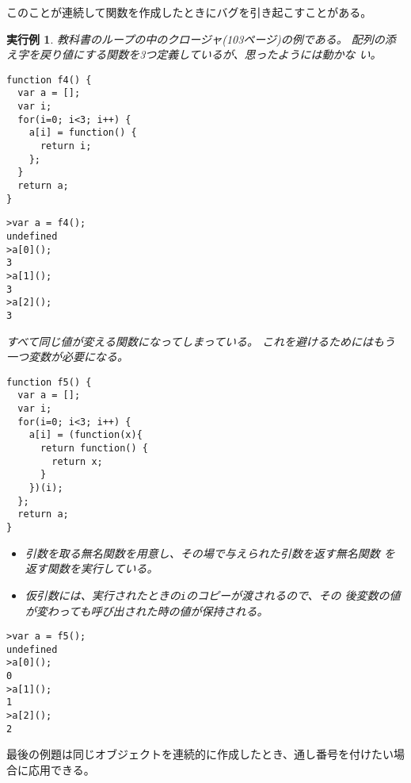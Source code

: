 \documentclass[a4j]{jarticle}
\newtheorem{Exec}{実行例}[section]
\begin{document}
このことが連続して関数を作成したときにバグを引き起こすことがある。
\begin{Exec}
 教科書のループの中のクロージャ(103ページ)の例である。
配列の添え字を戻り値にする関数を3つ定義しているが、思ったようには動かな
 い。
\begin{Verbatim}
function f4() {
  var a = [];
  var i;
  for(i=0; i<3; i++) {
    a[i] = function() {
      return i;
    };
  }
  return a;
}
\end{Verbatim}
\begin{Verbatim}
>var a = f4();
undefined
>a[0]();
3
>a[1]();
3
>a[2]();
3
\end{Verbatim}
すべて同じ値が変える関数になってしまっている。
これを避けるためにはもう一つ変数が必要になる。
\begin{Verbatim}
function f5() {
  var a = [];
  var i;
  for(i=0; i<3; i++) {
    a[i] = (function(x){
      return function() {
        return x;
      }
    })(i);
  };
  return a;
}
\end{Verbatim}
\begin{itemize}
 \item 引数を取る無名関数を用意し、その場で与えられた引数を返す無名関数
       を返す関数を実行している。
 \item 仮引数には、実行されたときの\verb+i+のコピーが渡されるので、その
       後変数の値が変わっても呼び出された時の値が保持される。
\end{itemize}
\begin{Verbatim}
>var a = f5();
undefined
>a[0]();
0
>a[1]();
1
>a[2]();
2
\end{Verbatim}
\end{Exec}
最後の例題は同じオブジェクトを連続的に作成したとき、通し番号を付けたい場
合に応用できる。
\end{document}
